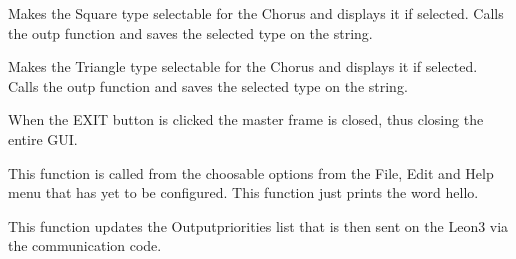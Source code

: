 \documentclass[letterpaper,10pt,english]{sphinxmanual}
\begin{document}

\begin{fulllineitems}
\label{Code:GUI.chorusSQUARE_val}
Makes the Square type selectable for the Chorus and displays it if selected. Calls the outp function and saves the selected 
type on the string.

\end{fulllineitems}


\begin{fulllineitems}
\label{Code:GUI.chorusTRIANGLE_val}
Makes the Triangle type selectable for the Chorus and displays it if selected. Calls the outp function and saves the selected 
type on the string.

\end{fulllineitems}


\begin{fulllineitems}
\label{Code:GUI.exitGUI}
When the EXIT button is clicked the master frame is closed, thus closing the entire GUI.

\end{fulllineitems}


\begin{fulllineitems}
\label{Code:GUI.hello}
This function is called from the choosable options from the File, Edit and Help menu that has yet to be configured.
This function just prints the word hello.

\end{fulllineitems}


\begin{fulllineitems}
\label{Code:GUI.labellistset}
This function updates the Outputpriorities list that is then sent on the Leon3 via the communication code.

\end{fulllineitems}

\end{document}

